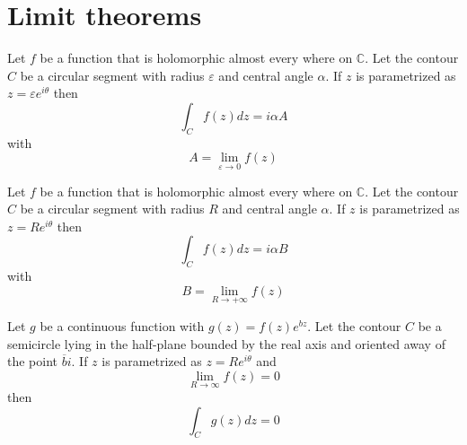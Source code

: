 \section{Limit theorems}
    	\begin{theorem}
			\label{complexcalculus:theorem:small_limit}
            Let $f$ be a function that is holomorphic almost every where on $\mathbb{C}$. Let the contour $C$ be a circular segment with radius $\varepsilon$ and central angle $\alpha$.
            If $z$ is parametrized as $z = \varepsilon e^{i\theta}$ then\[\int_Cf(z)dz = i\alpha A\]
            with \[A = \lim_{\varepsilon\rightarrow0}f(z)\]
		\end{theorem}
        \begin{theorem}
			\label{complexcalculus:theorem:great_limit}
            Let $f$ be a function that is holomorphic almost every where on $\mathbb{C}$. Let the contour $C$ be a circular segment with radius $R$ and central angle $\alpha$.
            If $z$ is parametrized as $z = Re^{i\theta}$ then\[\int_Cf(z)dz = i\alpha B\]
            with \[B = \lim_{R\rightarrow+\infty}f(z)\]
		\end{theorem}
        \begin{theorem}
			\label{complexcalculus:theorem:jordan}
            Let $g$ be a continuous function with $g(z) = f(z)e^{bz}$. Let the contour $C$ be a semicircle lying in the half-plane bounded by the real axis and oriented away of the point $\overline{b}i$. If $z$ is parametrized as $z=Re^{i\theta}$ and \[\lim_{R\rightarrow\infty}f(z) = 0\] then\[\int_Cg(z)dz = 0\]
		\end{theorem}